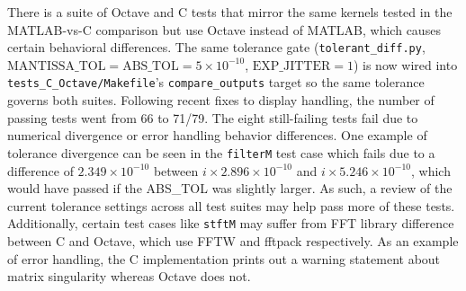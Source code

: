 There is a suite of Octave and C tests that mirror the same kernels tested in the MATLAB-vs-C comparison but use Octave instead of MATLAB, which causes certain behavioral differences. The same tolerance gate (\texttt{tolerant\_diff.py}, $\text{MANTISSA\_TOL} = \text{ABS\_TOL} = 5 \times 10^{-10}$, $\text{EXP\_JITTER} = 1$) is now wired into \texttt{tests\_C\_Octave/Makefile}'s \texttt{compare\_outputs} target so the same tolerance governs both suites. Following recent fixes to display handling, the number of passing tests went from 66 to 71/79. The eight still-failing tests fail due to numerical divergence or error handling behavior differences. 
One example of tolerance divergence can be seen in the \texttt{filterM} test case which fails due to a difference of $2.349 \times 10^{-10}$ between $i \times 2.896 \times 10^{-10}$ and $i \times 5.246 \times 10^{-10}$, which would have passed if the ABS\_TOL was slightly larger. As such, a review of the current tolerance settings across all test suites may help pass more of these tests.
Additionally, certain test cases like \texttt{stftM} may suffer from FFT library difference between C and Octave, which use FFTW and fftpack respectively. As an example of error handling, the C implementation prints out a warning statement about matrix singularity whereas Octave does not. 
